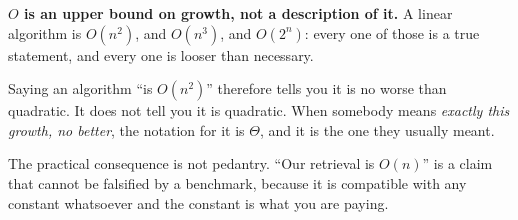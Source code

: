 \begin{fr}
\begin{trapbox}
\textbf{$O$ is an upper bound on growth, not a description of it.} A linear
algorithm is $O(n^{2})$, and $O(n^{3})$, and $O(2^{n})$: every one of those is
a true statement, and every one is looser than necessary.

Saying an algorithm \enquote{is $O(n^{2})$} therefore tells you it is no worse
than quadratic. It does not tell you it is quadratic. When somebody means
\emph{exactly this growth, no better}, the notation for it is $\Theta$, and it
is the one they usually meant.

The practical consequence is not pedantry. \enquote{Our retrieval is $O(n)$} is
a claim that cannot be falsified by a benchmark, because it is compatible with
any constant whatsoever \dash{} and the constant is what you are paying.
\end{trapbox}
\end{fr}

